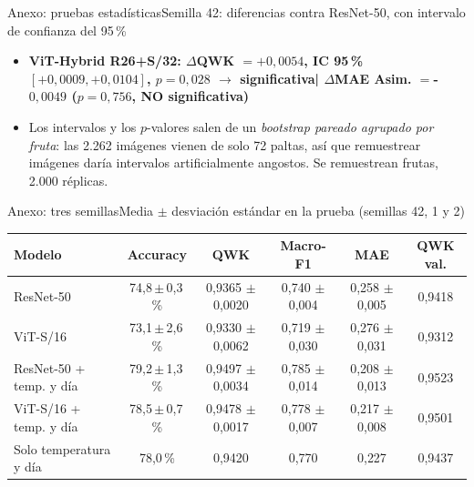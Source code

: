 \documentclass[aspectratio=169,11pt,table]{beamer}
\newcommand{\sig}{\textcolor{verdeosc}{\textbf{significativa}}}
\newcommand{\nosig}{\textcolor{rojo}{\textbf{NO significativa}}}
\begin{document}
\begin{frame}{Anexo: pruebas estadísticas}{Semilla 42: diferencias contra ResNet-50, con intervalo de confianza del 95\,\%}
{\begin{itemize}
  \item {\bfseries ViT-Hybrid R26+S/32: $\Delta$QWK $= +0{,}0054$, IC 95\,\% $[+0{,}0009, +0{,}0104]$, $p=0{,}028$ $\rightarrow$ \sig \;|\; $\Delta$MAE Asim. $= $-$0{,}0049$ ($p=0{,}756$, \nosig)}
  \item Los intervalos y los $p$-valores salen de un \emph{bootstrap pareado agrupado por fruta}: las 2.262 imágenes vienen de solo 72 paltas, así que remuestrear imágenes daría intervalos artificialmente angostos. Se remuestrean frutas, 2.000 réplicas.
\end{itemize}
}
\end{frame}

\begin{frame}{Anexo: tres semillas}{Media $\pm$ desviación estándar en la prueba (semillas 42, 1 y 2)}
{\scriptsize
\centering
\begin{tabular}{lccccc}
\toprule
\rowcolor{verdeosc}\color{white}\bfseries Modelo & \color{white}\bfseries Accuracy & \color{white}\bfseries QWK & \color{white}\bfseries Macro-F1 & \color{white}\bfseries MAE & \color{white}\bfseries QWK val. \\
\midrule
ResNet-50 & 74{,}8\,$\pm$\,0{,}3\,\% & 0{,}9365 $\pm$ 0{,}0020 & 0{,}740 $\pm$ 0{,}004 & 0{,}258 $\pm$ 0{,}005 & 0{,}9418 \\
ViT-S/16 & 73{,}1\,$\pm$\,2{,}6\,\% & 0{,}9330 $\pm$ 0{,}0062 & 0{,}719 $\pm$ 0{,}030 & 0{,}276 $\pm$ 0{,}031 & 0{,}9312 \\
ResNet-50 + temp. y día & 79{,}2\,$\pm$\,1{,}3\,\% & 0{,}9497 $\pm$ 0{,}0034 & 0{,}785 $\pm$ 0{,}014 & 0{,}208 $\pm$ 0{,}013 & 0{,}9523 \\
ViT-S/16 + temp. y día & 78{,}5\,$\pm$\,0{,}7\,\% & 0{,}9478 $\pm$ 0{,}0017 & 0{,}778 $\pm$ 0{,}007 & 0{,}217 $\pm$ 0{,}008 & 0{,}9501 \\
Solo temperatura y día & 78{,}0\,\% & 0{,}9420 & 0{,}770 & 0{,}227 & 0{,}9437 \\
\bottomrule
\end{tabular}
}
\end{frame}
\end{document}
